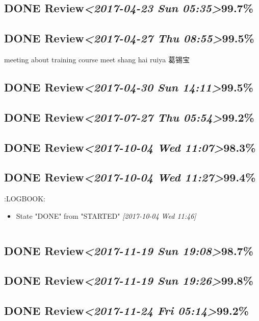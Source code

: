 \documentclass[11pt]{ctexart}
\begin{document}
\subsection{{\bfseries\sffamily DONE} Review\textit{<2017-04-23 Sun 05:35>}99.7\%}
\label{sec:orgeabef9a}
\subsection{{\bfseries\sffamily DONE} Review\textit{<2017-04-27 Thu 08:55>}99.5\%}
\label{sec:org8c9fb63}
meeting about training course
meet shang hai ruiya 葛锡宝
\subsection{{\bfseries\sffamily DONE} Review\textit{<2017-04-30 Sun 14:11>}99.5\%}
\label{sec:orgb093ded}
\subsection{{\bfseries\sffamily DONE} Review\textit{<2017-07-27 Thu 05:54>}99.2\%}
\label{sec:org112e5f8}
\subsection{{\bfseries\sffamily DONE} Review\textit{<2017-10-04 Wed 11:07>}98.3\%}
\label{sec:org10fd412}
\subsection{{\bfseries\sffamily DONE} Review\textit{<2017-10-04 Wed 11:27>}99.4\%}
\label{sec:org32378ec}
:LOGBOOK:
\begin{itemize}
\item State "DONE"       from "STARTED"    \textit{[2017-10-04 Wed 11:46]}
\end{itemize}
\begin{verbatim}

\end{verbatim}
\subsection{{\bfseries\sffamily DONE} Review\textit{<2017-11-19 Sun 19:08>}98.7\%}
\label{sec:org58a1074}
\subsection{{\bfseries\sffamily DONE} Review\textit{<2017-11-19 Sun 19:26>}99.8\%}
\label{sec:org78f05b7}
\subsection{{\bfseries\sffamily DONE} Review\textit{<2017-11-24 Fri 05:14>}99.2\%}
\label{sec:org7e30bee}
\end{document}
